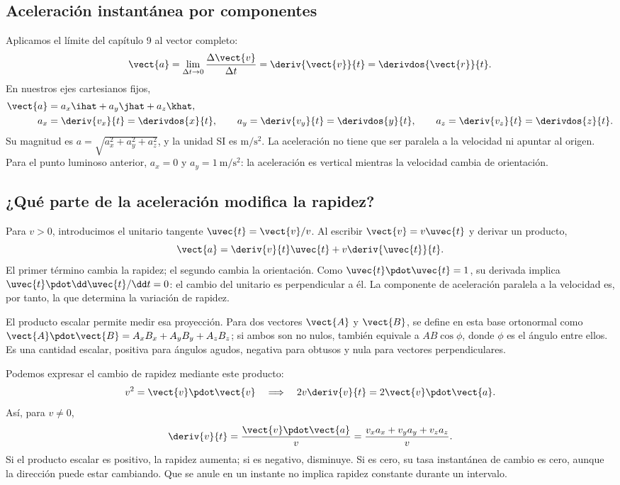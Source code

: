 \subsection{Aceleración instantánea por componentes}

Aplicamos el límite del capítulo 9 al vector completo:
\[ \vect{a}=\lim_{\Delta t\to0}\frac{\Delta\vect{v}}{\Delta t}
=\deriv{\vect{v}}{t}=\derivdos{\vect{r}}{t}. \]
En nuestros ejes cartesianos fijos,
\[
\begin{aligned}
\vect{a}&=a_x\ihat+a_y\jhat+a_z\khat,\\
a_x&=\deriv{v_x}{t}=\derivdos{x}{t},\qquad
a_y=\deriv{v_y}{t}=\derivdos{y}{t},\qquad
a_z=\deriv{v_z}{t}=\derivdos{z}{t}.
\end{aligned}
\]
Su magnitud es \(a=\sqrt{a_x^2+a_y^2+a_z^2}\), y la unidad SI es
\(\si{\meter\per\second\squared}\). La aceleración no tiene que ser
paralela a la velocidad ni apuntar al origen. Para el punto luminoso
anterior, \(a_x=0\) y \(a_y=\SI{1}{\meter\per\second\squared}\):
la aceleración es vertical mientras la velocidad cambia de orientación.

\subsection{¿Qué parte de la aceleración modifica la rapidez?}

Para \(v>0\), introducimos el unitario tangente \(\uvec{t}=\vect{v}/v\).
Al escribir \(\vect{v}=v\uvec{t}\) y derivar un producto,
\[ \vect{a}=\deriv{v}{t}\uvec{t}+v\deriv{\uvec{t}}{t}. \]
El primer término cambia la rapidez; el segundo cambia la orientación.
Como \(\uvec{t}\pdot\uvec{t}=1\), su derivada implica
\(\uvec{t}\pdot\dd\uvec{t}/\dd t=0\): el cambio del unitario es
perpendicular a él. La componente de aceleración paralela a la velocidad
es, por tanto, la que determina la variación de rapidez.

El producto escalar permite medir esa proyección. Para dos vectores
\(\vect{A}\) y \(\vect{B}\), se define en esta base ortonormal como
\(\vect{A}\pdot\vect{B}=A_xB_x+A_yB_y+A_zB_z\); si ambos son no nulos,
también equivale a \(AB\cos\phi\), donde \(\phi\) es el ángulo entre
ellos. Es una cantidad escalar, positiva para ángulos agudos, negativa
para obtusos y nula para vectores perpendiculares.

Podemos expresar el cambio de rapidez mediante este producto:
\[ v^2=\vect{v}\pdot\vect{v}
\quad\Longrightarrow\quad 2v\deriv{v}{t}=2\vect{v}\pdot\vect{a}. \]
Así, para \(v\ne0\),
\[ \deriv{v}{t}=\frac{\vect{v}\pdot\vect{a}}{v}
=\frac{v_xa_x+v_ya_y+v_za_z}{v}. \]
Si el producto escalar es positivo, la rapidez aumenta; si es negativo,
disminuye. Si es cero, su tasa instantánea de cambio es cero, aunque la
dirección puede estar cambiando. Que se anule en un instante no implica
rapidez constante durante un intervalo.

